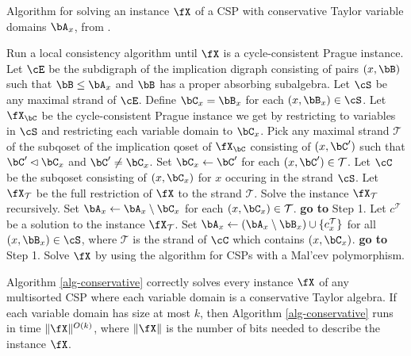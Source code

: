 \begin{algorithm}
\caption{Algorithm for solving an instance $\fX$ of a CSP with conservative Taylor variable domains $\bA_x$, from \cite{barto-conservative-revisited}.}\label{alg-conservative}
\begin{algorithmic}[1]
\State Run a local consistency algorithm until $\fX$ is a cycle-consistent Prague instance.
\State Let $\cE$ be the subdigraph of the implication digraph consisting of pairs $(x,\bB)$ such that $\bB \le \bA_x$ and $\bB$ has a proper absorbing subalgebra.
\State Let $\cS$ be any maximal strand of $\cE$. 
\State Define $\bC_x = \bB_x$ for each $(x,\bB_x) \in \cS$.
\State Let $\fX_\bC$ be the cycle-consistent Prague instance we get by restricting to variables in $\cS$ and restricting each variable domain to $\bC_x$. 
\State Pick any maximal strand $\mathcal{T}$ of the subqoset of the implication qoset of $\fX_\bC$ consisting of $(x,\bC')$ such that $\bC' \lhd \bC_x$ and $\bC' \ne \bC_x$. 
\State Set $\bC_x \gets \bC'$ for each $(x,\bC') \in \mathcal{T}$.
\EndWhile
\State Let $\cC$ be the subqoset consisting of $(x,\bC_x)$ for $x$ occuring in the strand $\cS$.
\State Let $\fX_\mathcal{T}$ be the full restriction of $\fX$ to the strand $\mathcal{T}$.
\State Solve the instance $\fX_\mathcal{T}$ recursively. 
\State Set $\bA_x \gets \bA_x \setminus \bC_x$ for each $(x,\bC_x) \in \mathcal{T}$.
\State \textbf{go to} Step 1.
\Else
\State Let $c^\mathcal{T}$ be a solution to the instance $\fX_\mathcal{T}$.
\EndIf
\EndFor
\State Set $\bA_x \gets (\bA_x \setminus \bB_x) \cup \{c^\mathcal{T}_x\}$ for all $(x,\bB_x) \in \cS$, where $\mathcal{T}$ is the strand of $\cC$ which contains $(x,\bC_x)$. 
\State \textbf{go to} Step 1.
\EndIf
\State Solve $\fX$ by using the algorithm for CSPs with a Mal'cev polymorphism. 
\end{algorithmic}
\end{algorithm}

\begin{thm} Algorithm \ref{alg-conservative} correctly solves every instance $\fX$ of any multisorted CSP where each variable domain is a conservative Taylor algebra. If each variable domain has size at most $k$, then Algorithm \ref{alg-conservative} runs in time $\|\fX\|^{O(k)}$, where $\|\fX\|$ is the number of bits needed to describe the instance $\fX$.
\end{thm}


